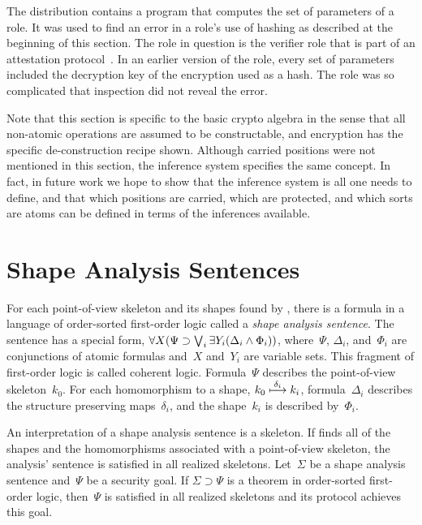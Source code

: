 \documentclass[12pt]{report}
\theoremstyle{definition}
\begin{document}
The {\cpsa} distribution contains a program that computes the set of
parameters of a role.  It was used to find an error in a role's use of
hashing as described at the beginning of this section.  The role in
question is the verifier role that is part of an attestation
protocol~\cite{CokerEtAl11}.  In an earlier version of the role,
every set of parameters included the decryption key of the encryption
used as a hash.  The role was so complicated that inspection did not
reveal the error.

Note that this section is specific to the basic crypto algebra in the
sense that all non-atomic operations are assumed to be constructable,
and encryption has the specific de-construction recipe shown.  Although
carried positions were not mentioned in this section, the inference system
specifies the same concept.  In fact, in future work we hope to show that
the inference system is all one needs to define, and that which positions
are carried, which are protected, and which sorts are atoms can be defined
in terms of the inferences available.

\chapter{Shape Analysis Sentences}\label{chp:logic}

For each point-of-view skeleton and its shapes found by {\cpsa}, there
is a formula in a language of order-sorted first-order logic called
a \emph{shape analysis sentence}.  The
sentence has a special form,
$\mathop{\forall X}(\Psi\supset\bigvee_i\mathop{\exists Y_i}(\Delta_i\wedge\Phi_i))$,
where~$\Psi$, $\Delta_i$, and~$\Phi_i$ are conjunctions of atomic
formulas and~$X$ and~$Y_i$ are variable sets.  This fragment of
first-order logic is called coherent logic.  Formula~$\Psi$ describes
the point-of-view skeleton~$k_0$.  For each homomorphism to a shape,
$k_0\stackrel{\delta_i}{\longmapsto}k_i$, formula~$\Delta_i$ describes the
structure preserving maps~$\delta_i$, and the shape~$k_i$ is described
by~$\Phi_i$.

An interpretation of a shape analysis sentence is a skeleton.  If
{\cpsa} finds all of the shapes and the homomorphisms associated with
a point-of-view skeleton, the analysis' sentence is satisfied in all
realized skeletons.  Let~$\Sigma$ be a shape analysis sentence
and~$\Psi$ be a security goal.  If $\Sigma\supset\Psi$ is a theorem in
order-sorted first-order logic, then~$\Psi$ is satisfied in all
realized skeletons and its protocol achieves this goal.
\end{document}

